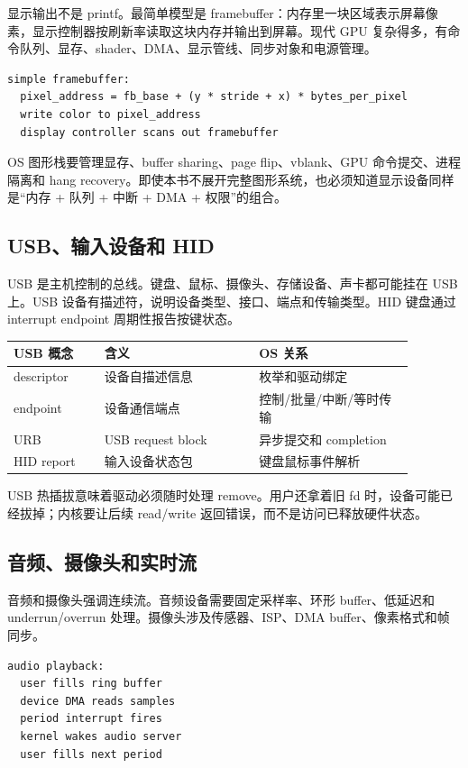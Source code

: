 显示输出不是 printf。最简单模型是 framebuffer：内存里一块区域表示屏幕像素，显示控制器按刷新率读取这块内存并输出到屏幕。现代 GPU 复杂得多，有命令队列、显存、shader、DMA、显示管线、同步对象和电源管理。

\begin{lstlisting}
simple framebuffer:
  pixel_address = fb_base + (y * stride + x) * bytes_per_pixel
  write color to pixel_address
  display controller scans out framebuffer
\end{lstlisting}

OS 图形栈要管理显存、buffer sharing、page flip、vblank、GPU 命令提交、进程隔离和 hang recovery。即使本书不展开完整图形系统，也必须知道显示设备同样是“内存 + 队列 + 中断 + DMA + 权限”的组合。

\subsection{USB、输入设备和 HID}

USB 是主机控制的总线。键盘、鼠标、摄像头、存储设备、声卡都可能挂在 USB 上。USB 设备有描述符，说明设备类型、接口、端点和传输类型。HID 键盘通过 interrupt endpoint 周期性报告按键状态。

\begin{longtable}{p{0.2\linewidth}p{0.34\linewidth}p{0.34\linewidth}}
\toprule
USB 概念 & 含义 & OS 关系 \\
\midrule
descriptor & 设备自描述信息 & 枚举和驱动绑定 \\
endpoint & 设备通信端点 & 控制/批量/中断/等时传输 \\
URB & USB request block & 异步提交和 completion \\
HID report & 输入设备状态包 & 键盘鼠标事件解析 \\
\bottomrule
\end{longtable}

USB 热插拔意味着驱动必须随时处理 remove。用户还拿着旧 fd 时，设备可能已经拔掉；内核要让后续 read/write 返回错误，而不是访问已释放硬件状态。

\subsection{音频、摄像头和实时流}

音频和摄像头强调连续流。音频设备需要固定采样率、环形 buffer、低延迟和 underrun/overrun 处理。摄像头涉及传感器、ISP、DMA buffer、像素格式和帧同步。

\begin{lstlisting}
audio playback:
  user fills ring buffer
  device DMA reads samples
  period interrupt fires
  kernel wakes audio server
  user fills next period
\end{lstlisting}

